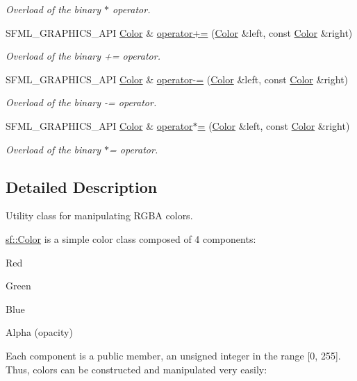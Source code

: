 \begin{DoxyCompactItemize}
\begin{DoxyCompactList}\small\item\em Overload of the binary $\ast$ operator. \end{DoxyCompactList}\item 
S\+F\+M\+L\+\_\+\+G\+R\+A\+P\+H\+I\+C\+S\+\_\+\+A\+PI \hyperlink{classsf_1_1_color}{Color} \& \hyperlink{classsf_1_1_color_a19917f2453a4acfd69de2539bfab8031}{operator+=} (\hyperlink{classsf_1_1_color}{Color} \&left, const \hyperlink{classsf_1_1_color}{Color} \&right)
\begin{DoxyCompactList}\small\item\em Overload of the binary += operator. \end{DoxyCompactList}\item 
S\+F\+M\+L\+\_\+\+G\+R\+A\+P\+H\+I\+C\+S\+\_\+\+A\+PI \hyperlink{classsf_1_1_color}{Color} \& \hyperlink{classsf_1_1_color_a86ceee6b959136932020db4036918ecd}{operator-\/=} (\hyperlink{classsf_1_1_color}{Color} \&left, const \hyperlink{classsf_1_1_color}{Color} \&right)
\begin{DoxyCompactList}\small\item\em Overload of the binary -\/= operator. \end{DoxyCompactList}\item 
S\+F\+M\+L\+\_\+\+G\+R\+A\+P\+H\+I\+C\+S\+\_\+\+A\+PI \hyperlink{classsf_1_1_color}{Color} \& \hyperlink{classsf_1_1_color_a8953be58a47ced92fb25966d6ee90511}{operator$\ast$=} (\hyperlink{classsf_1_1_color}{Color} \&left, const \hyperlink{classsf_1_1_color}{Color} \&right)
\begin{DoxyCompactList}\small\item\em Overload of the binary $\ast$= operator. \end{DoxyCompactList}\end{DoxyCompactItemize}


\subsection{Detailed Description}
Utility class for manipulating R\+G\+BA colors. 

\hyperlink{classsf_1_1_color}{sf\+::\+Color} is a simple color class composed of 4 components\+: \begin{DoxyItemize}
\item Red \item Green \item Blue \item Alpha (opacity)\end{DoxyItemize}
Each component is a public member, an unsigned integer in the range \mbox{[}0, 255\mbox{]}. Thus, colors can be constructed and manipulated very easily\+:


